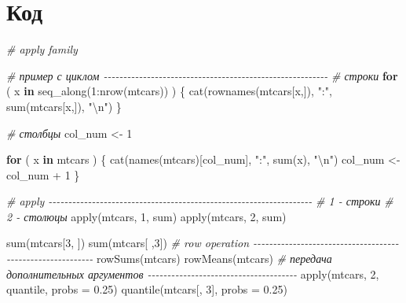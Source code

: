 \documentclass[
]{book}
\newenvironment{Shaded}{\begin{snugshade}}{\end{snugshade}}
\newcommand{\AttributeTok}[1]{\textcolor[rgb]{0.77,0.63,0.00}{#1}}
\newcommand{\CommentTok}[1]{\textcolor[rgb]{0.56,0.35,0.01}{\textit{#1}}}
\newcommand{\ControlFlowTok}[1]{\textcolor[rgb]{0.13,0.29,0.53}{\textbf{#1}}}
\newcommand{\DecValTok}[1]{\textcolor[rgb]{0.00,0.00,0.81}{#1}}
\newcommand{\FloatTok}[1]{\textcolor[rgb]{0.00,0.00,0.81}{#1}}
\newcommand{\FunctionTok}[1]{\textcolor[rgb]{0.00,0.00,0.00}{#1}}
\newcommand{\NormalTok}[1]{#1}
\newcommand{\OtherTok}[1]{\textcolor[rgb]{0.56,0.35,0.01}{#1}}
\newcommand{\SpecialCharTok}[1]{\textcolor[rgb]{0.00,0.00,0.00}{#1}}
\newcommand{\StringTok}[1]{\textcolor[rgb]{0.31,0.60,0.02}{#1}}
\begin{document}
\hypertarget{ux43aux43eux434-2}{%
\section{Код}\label{ux43aux43eux434-2}}

\begin{Shaded}
\begin{Highlighting}[]
\CommentTok{\# apply family}

\CommentTok{\# пример с циклом {-}{-}{-}{-}{-}{-}{-}{-}{-}{-}{-}{-}{-}{-}{-}{-}{-}{-}{-}{-}{-}{-}{-}{-}{-}{-}{-}{-}{-}{-}{-}{-}{-}{-}{-}{-}{-}{-}{-}{-}{-}{-}{-}{-}{-}{-}{-}{-}{-}{-}{-}{-}{-}{-}{-}{-}{-}}
\CommentTok{\# строки}
\ControlFlowTok{for}\NormalTok{ ( x }\ControlFlowTok{in} \FunctionTok{seq\_along}\NormalTok{(}\DecValTok{1}\SpecialCharTok{:}\FunctionTok{nrow}\NormalTok{(mtcars)) ) \{}
  \FunctionTok{cat}\NormalTok{(}\FunctionTok{rownames}\NormalTok{(mtcars[x,]), }\StringTok{":"}\NormalTok{, }\FunctionTok{sum}\NormalTok{(mtcars[x,]), }\StringTok{"}\SpecialCharTok{\textbackslash{}n}\StringTok{"}\NormalTok{)}
\NormalTok{\}}

\CommentTok{\# столбцы}
\NormalTok{col\_num }\OtherTok{\textless{}{-}} \DecValTok{1}

\ControlFlowTok{for}\NormalTok{ ( x }\ControlFlowTok{in}\NormalTok{ mtcars ) \{}
  \FunctionTok{cat}\NormalTok{(}\FunctionTok{names}\NormalTok{(mtcars)[col\_num], }\StringTok{":"}\NormalTok{, }\FunctionTok{sum}\NormalTok{(x), }\StringTok{"}\SpecialCharTok{\textbackslash{}n}\StringTok{"}\NormalTok{)}
\NormalTok{  col\_num }\OtherTok{\textless{}{-}}\NormalTok{ col\_num }\SpecialCharTok{+} \DecValTok{1}
\NormalTok{\}}

\CommentTok{\# apply {-}{-}{-}{-}{-}{-}{-}{-}{-}{-}{-}{-}{-}{-}{-}{-}{-}{-}{-}{-}{-}{-}{-}{-}{-}{-}{-}{-}{-}{-}{-}{-}{-}{-}{-}{-}{-}{-}{-}{-}{-}{-}{-}{-}{-}{-}{-}{-}{-}{-}{-}{-}{-}{-}{-}{-}{-}{-}{-}{-}{-}{-}{-}{-}{-}{-}{-}}
\CommentTok{\# 1 {-} строки}
\CommentTok{\# 2 {-} столюцы}
\FunctionTok{apply}\NormalTok{(mtcars, }\DecValTok{1}\NormalTok{, sum)}
\FunctionTok{apply}\NormalTok{(mtcars, }\DecValTok{2}\NormalTok{, sum)}

\FunctionTok{sum}\NormalTok{(mtcars[}\DecValTok{3}\NormalTok{, ])}
\FunctionTok{sum}\NormalTok{(mtcars[ ,}\DecValTok{3}\NormalTok{])}
\CommentTok{\# row operation {-}{-}{-}{-}{-}{-}{-}{-}{-}{-}{-}{-}{-}{-}{-}{-}{-}{-}{-}{-}{-}{-}{-}{-}{-}{-}{-}{-}{-}{-}{-}{-}{-}{-}{-}{-}{-}{-}{-}{-}{-}{-}{-}{-}{-}{-}{-}{-}{-}{-}{-}{-}{-}{-}{-}{-}{-}{-}{-}}
\FunctionTok{rowSums}\NormalTok{(mtcars)}
\FunctionTok{rowMeans}\NormalTok{(mtcars)}
\CommentTok{\# передача дополнительных аргументов {-}{-}{-}{-}{-}{-}{-}{-}{-}{-}{-}{-}{-}{-}{-}{-}{-}{-}{-}{-}{-}{-}{-}{-}{-}{-}{-}{-}{-}{-}{-}{-}{-}{-}{-}{-}{-}{-}}
\FunctionTok{apply}\NormalTok{(mtcars, }\DecValTok{2}\NormalTok{, quantile, }\AttributeTok{probs =} \FloatTok{0.25}\NormalTok{)}
\FunctionTok{quantile}\NormalTok{(mtcars[, }\DecValTok{3}\NormalTok{], }\AttributeTok{probs =} \FloatTok{0.25}\NormalTok{)}


\end{Highlighting}
\end{Shaded}
\end{document}
